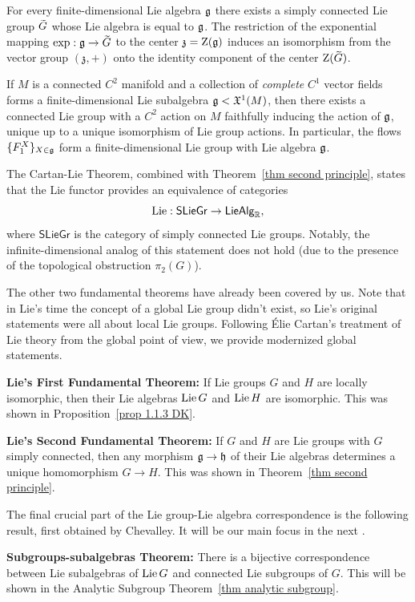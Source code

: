 \begin{thm}\label{thm 1.14.3 DK global Lie's third}
    For every finite-dimensional Lie algebra $\mathfrak{g}$ there exists a simply connected Lie group $\wt{G}$ whose Lie algebra is equal to $\mathfrak{g}$. The restriction of the exponential mapping $\exp:\frakg\to\wt{G}$ to the center $\mathfrak{z}=\mathrm{Z}(\mathfrak{g})$ induces an isomorphism from the vector group $(\mathfrak{z},+)$ onto the identity component of the center $\rmZ(\wt{G})$.
\end{thm}
\begin{cor}\label{thm Lie-Palais}
    If $M$ is a connected $C^2$ manifold and a collection of \emph{complete} $C^1$ vector fields forms a finite-dimensional Lie subalgebra $\mathfrak{g}<\mathfrak{X}^1(M)$, then there exists a connected Lie group with a $C^2$ action on $M$ faithfully inducing the action of $\mathfrak{g}$, unique up to a unique isomorphism of Lie group actions. In particular, the flows $\{F^X_1\}_{X\in \mathfrak{g}}$ form a finite-dimensional Lie group with Lie algebra $\mathfrak{g}$.
\end{cor}

\begin{rem}
    The Cartan-Lie Theorem, combined with Theorem~\ref{thm second principle}, states that the Lie functor provides an equivalence of categories
    \[\operatorname{Lie}:\mathsf{SLieGr}\to \mathsf{LieAlg}_{\mathbb{R}},\]
    where $\mathsf{SLieGr}$ is the category of simply connected Lie groups. Notably, the infinite-dimensional analog of this statement does not hold (due to the presence of the topological obstruction $\pi_2(G)$).

    The other two fundamental theorems have already been covered by us. Note that in Lie's time the concept of a global Lie group didn't exist, so Lie's original statements were all about local Lie groups. Following \'Elie Cartan's treatment of Lie theory from the global point of view, we provide modernized global statements.

    \textbf{Lie's First Fundamental Theorem:} If Lie groups $G$ and $H$ are locally isomorphic, then their Lie algebras $\operatorname{Lie} G$ and $\operatorname{Lie} H$ are isomorphic. This was shown in Proposition~\ref{prop 1.1.3 DK}.

    \textbf{Lie's Second Fundamental Theorem:} If $G$ and $H$ are Lie groups with $G$ simply connected, then any morphism $\mathfrak{g}\to\mathfrak{h}$ of their Lie algebras determines a unique homomorphism $G\to H$. This was shown in Theorem~\ref{thm second principle}.
    
    The final crucial part of the Lie group-Lie algebra correspondence is the following result, first obtained by Chevalley. It will be our main focus in the next \subsect.

    \textbf{Subgroups-subalgebras Theorem:} There is a bijective correspondence between Lie subalgebras of $\operatorname{Lie} G$ and connected Lie subgroups of $G$. This will be shown in the Analytic Subgroup Theorem~\ref{thm analytic subgroup}.
\end{rem}


